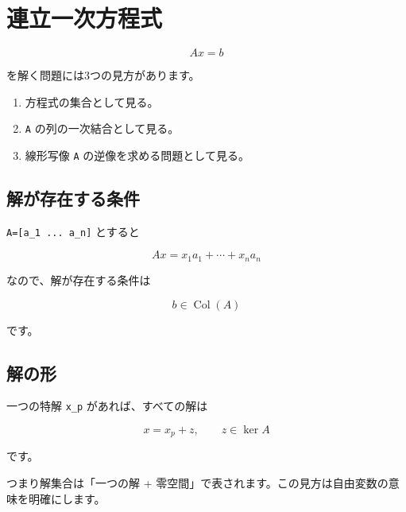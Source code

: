 \documentclass[
  11pt,
  a4paper,
]{ltjsarticle}
\author{}
\date{}
\providecommand{\tightlist}{%
  \setlength{\itemsep}{0pt}\setlength{\parskip}{0pt}}
\begin{document}
\hypertarget{ux9023ux7acbux4e00ux6b21ux65b9ux7a0bux5f0f}{%
\section{連立一次方程式}\label{ux9023ux7acbux4e00ux6b21ux65b9ux7a0bux5f0f}}

\[
Ax=b
\]

を解く問題には3つの見方があります。

\begin{enumerate}
\def\labelenumi{\arabic{enumi}.}
\tightlist
\item
  方程式の集合として見る。
\item
  \texttt{A} の列の一次結合として見る。
\item
  線形写像 \texttt{A} の逆像を求める問題として見る。
\end{enumerate}

\hypertarget{ux89e3ux304cux5b58ux5728ux3059ux308bux6761ux4ef6}{%
\subsection{解が存在する条件}\label{ux89e3ux304cux5b58ux5728ux3059ux308bux6761ux4ef6}}

\texttt{A={[}a\_1\ ...\ a\_n{]}} とすると

\[
Ax=x_1a_1+\cdots+x_na_n
\]

なので、解が存在する条件は

\[
b\in\operatorname{Col}(A)
\]

です。

\hypertarget{ux89e3ux306eux5f62}{%
\subsection{解の形}\label{ux89e3ux306eux5f62}}

一つの特解 \texttt{x\_p} があれば、すべての解は

\[
x=x_p+z,\qquad z\in\ker A
\]

です。

つまり解集合は「一つの解 +
零空間」で表されます。この見方は自由変数の意味を明確にします。
\end{document}
